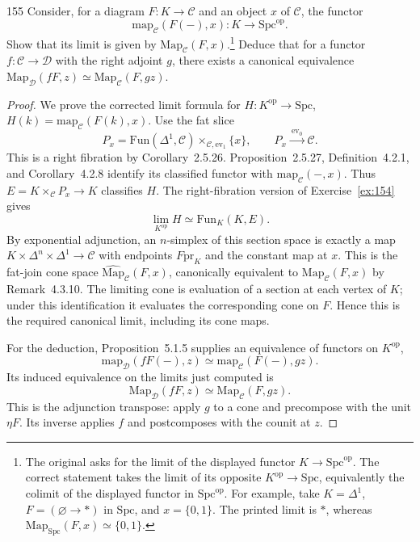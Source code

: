 \begin{exercise}{155}
Consider, for a diagram $F\colon K\to\mathcal{C}$ and an object $x$ of $\mathcal{C}$, the functor
\[
 \mathrm{map}_{\mathcal{C}}(F(-),x)\colon K\to\mathrm{Spc}^{\mathrm{op}}.
\]
Show that its limit is given by $\mathrm{Map}_{\mathcal{C}}(F,x)$.\footnote{The original asks for the limit of the displayed functor $K\to\mathrm{Spc}^{\mathrm{op}}$.
The correct statement takes the limit of its opposite $K^{\mathrm{op}}\to\mathrm{Spc}$, equivalently the colimit of the displayed functor in $\mathrm{Spc}^{\mathrm{op}}$.
For example, take $K=\Delta^1$, $F=(\varnothing\to *)$ in $\mathrm{Spc}$, and $x=\{0,1\}$.
The printed limit is $*$, whereas $\mathrm{Map}_{\mathrm{Spc}}(F,x)\simeq\{0,1\}$.}
Deduce that for a functor $f\colon\mathcal{C}\to\mathcal{D}$ with the
right adjoint $g$, there exists a canonical equivalence $\mathrm{Map}_{\mathcal{D}}(fF,z)\simeq\mathrm{Map}_{\mathcal{C}}(F,gz)$.

\begin{proof}
We prove the corrected limit formula for
$H\colon K^{\mathrm{op}}\to\mathrm{Spc}$, $H(k)=\mathrm{map}_{\mathcal{C}}(F(k),x)$.
Use the fat slice
\[
 P_x=\mathrm{Fun}(\Delta^1,\mathcal{C})
       \times_{\mathcal{C},\mathrm{ev}_1}\{x\},\qquad
 P_x\xrightarrow{\ \mathrm{ev}_0\ }\mathcal{C}.
\]
This is a right fibration by Corollary~2.5.26.
Proposition~2.5.27, Definition~4.2.1, and Corollary~4.2.8 identify
its classified functor with $\mathrm{map}_{\mathcal{C}}(-,x)$.
Thus $E=K\times_{\mathcal{C}}P_x\to K$ classifies $H$.
The right-fibration version of Exercise~\ref{ex:154} gives
\[
 \lim_{K^{\mathrm{op}}}H\simeq\mathrm{Fun}_K(K,E).
\]
By exponential adjunction, an $n$-simplex of this section space is
exactly a map $K\times\Delta^n\times\Delta^1\to\mathcal{C}$ with
endpoints $F\mathrm{pr}_K$ and the constant map at $x$.
This is the fat-join cone space
$\widehat{\mathrm{Map}}_{\mathcal{C}}(F,x)$, canonically equivalent to
$\mathrm{Map}_{\mathcal{C}}(F,x)$ by Remark~4.3.10.
The limiting cone is evaluation of a section at each vertex of $K$;
under this identification it evaluates the corresponding cone on $F$.
Hence this is the required canonical limit, including its cone maps.

For the deduction, Proposition~5.1.5 supplies an equivalence of
functors on $K^{\mathrm{op}}$,
\[
 \mathrm{map}_{\mathcal{D}}(fF(-),z)
 \simeq\mathrm{map}_{\mathcal{C}}(F(-),gz).
\]
Its induced equivalence on the limits just computed is
\[
 \mathrm{Map}_{\mathcal{D}}(fF,z)
 \simeq\mathrm{Map}_{\mathcal{C}}(F,gz).
\]
This is the adjunction transpose: apply $g$ to a cone and precompose
with the unit $\eta F$.
Its inverse applies $f$ and postcomposes with the counit at $z$.
\end{proof}
\end{exercise}
